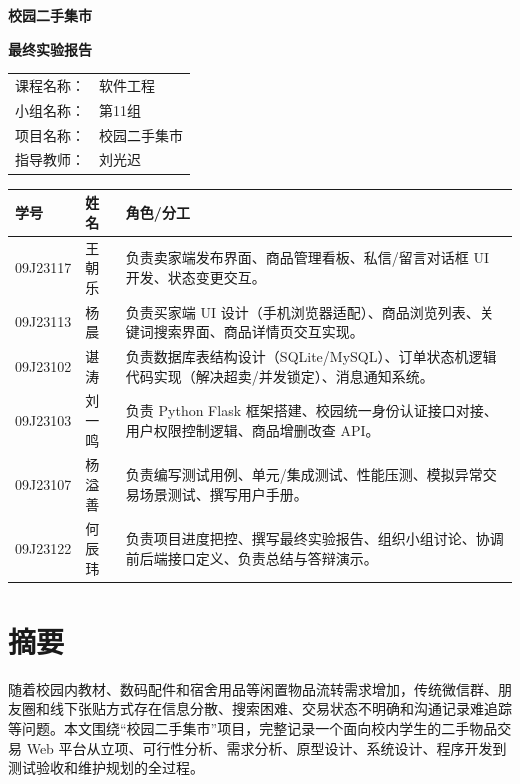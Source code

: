 ﻿\documentclass[UTF8,a4paper,12pt]{ctexart}
\newcommand{\projectname}{校园二手集市}
\newcommand{\coursename}{软件工程}
\newcommand{\teamname}{第11组}
\begin{document}
\begin{titlepage}
  \centering
  \vspace*{2cm}

  {\bfseries \projectname\par}
  \vspace{1cm}
  {\bfseries 最终实验报告\par}
  \vspace{2cm}

  \begin{tabular}{rl}
    课程名称： & \coursename \\
    小组名称： & \teamname \\
    项目名称： & \projectname \\
    指导教师： & 刘光迟 \\
  \end{tabular}

  \vfill

  \small
  \setlength{\tabcolsep}{4pt}
  \renewcommand{\arraystretch}{1.15}
  \begin{tabular}{L{2.5cm}L{1.8cm}L{9.9cm}}
    \toprule
    学号 & 姓名 & 角色/分工 \\
    \midrule
    09J23117 & 王朝乐 & 负责卖家端发布界面、商品管理看板、私信/留言对话框 UI 开发、状态变更交互。 \\
    09J23113 & 杨晨 & 负责买家端 UI 设计（手机浏览器适配）、商品浏览列表、关键词搜索界面、商品详情页交互实现。 \\
    09J23102 & 谌涛 & 负责数据库表结构设计（SQLite/MySQL）、订单状态机逻辑代码实现（解决超卖/并发锁定）、消息通知系统。 \\
    09J23103 & 刘一鸣 & 负责 Python Flask 框架搭建、校园统一身份认证接口对接、用户权限控制逻辑、商品增删改查 API。 \\
    09J23107 & 杨溢善 & 负责编写测试用例、单元/集成测试、性能压测、模拟异常交易场景测试、撰写用户手册。 \\
    09J23122 & 何辰玮 & 负责项目进度把控、撰写最终实验报告、组织小组讨论、协调前后端接口定义、负责总结与答辩演示。 \\
    \bottomrule
  \end{tabular}
\end{titlepage}


\section*{摘要}
随着校园内教材、数码配件和宿舍用品等闲置物品流转需求增加，传统微信群、朋友圈和线下张贴方式存在信息分散、搜索困难、交易状态不明确和沟通记录难追踪等问题。本文围绕“校园二手集市”项目，完整记录一个面向校内学生的二手物品交易 Web 平台从立项、可行性分析、需求分析、原型设计、系统设计、程序开发到测试验收和维护规划的全过程。
\end{document}

